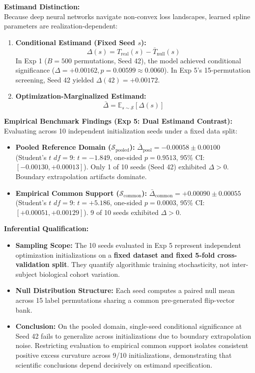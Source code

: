 \documentclass{article}
\begin{document}
\textbf{Estimand Distinction:}\\
Because deep neural networks navigate non-convex loss landscapes, learned spline parameters are realization-dependent:
\begin{enumerate}
    \item \textbf{Conditional Estimand (Fixed Seed $s$):}
    \begin{equation}
    \Delta(s) = T_{\mathrm{real}}(s) - \bar{T}_{\mathrm{null}}(s)
    \end{equation}
    In Exp 1 ($B=500$ permutations, Seed 42), the model achieved conditional significance ($\Delta = +0.00162, p = 0.00599 \approx 0.0060$). In Exp 5's 15-permutation screening, Seed 42 yielded $\Delta(42) = +0.00172$.
    \item \textbf{Optimization-Marginalized Estimand:}
    \begin{equation}
    \bar{\Delta} = \mathbb{E}_{s \sim \mathcal{S}} [\Delta(s)]
    \end{equation}
\end{enumerate}

\textbf{Empirical Benchmark Findings (Exp 5: Dual Estimand Contrast):}\\
Evaluating across 10 independent initialization seeds under a fixed data split:
\begin{itemize}
    \item \textbf{Pooled Reference Domain ($\mathcal{S}_{\mathrm{pooled}}$):} $\bar{\Delta}_{\mathrm{pool}} = -0.00058 \pm 0.00100$ (Student's $t$ $df=9$: $t = -1.849$, one-sided $p = 0.9513$, 95\% CI: $[-0.00130, +0.00013]$). Only 1 of 10 seeds (Seed 42) exhibited $\Delta > 0$. Boundary extrapolation artifacts dominate.
    \item \textbf{Empirical Common Support ($\mathcal{S}_{\mathrm{common}}$):} $\bar{\Delta}_{\mathrm{common}} = +0.00090 \pm 0.00055$ (Student's $t$ $df=9$: $t = +5.186$, one-sided $p = 0.0003$, 95\% CI: $[+0.00051, +0.00129]$). 9 of 10 seeds exhibited $\Delta > 0$.
\end{itemize}

\textbf{Inferential Qualification:}\\
\begin{itemize}
    \item \textbf{Sampling Scope:} The 10 seeds evaluated in Exp 5 represent independent optimization initializations on a \textbf{fixed dataset and fixed 5-fold cross-validation split}. They quantify algorithmic training stochasticity, not inter-subject biological cohort variation.
    \item \textbf{Null Distribution Structure:} Each seed computes a paired null mean across 15 label permutations sharing a common pre-generated flip-vector bank.
    \item \textbf{Conclusion:} On the pooled domain, single-seed conditional significance at Seed 42 fails to generalize across initializations due to boundary extrapolation noise. Restricting evaluation to empirical common support isolates consistent positive excess curvature across 9/10 initializations, demonstrating that scientific conclusions depend decisively on estimand specification.
\end{itemize}
\end{document}

